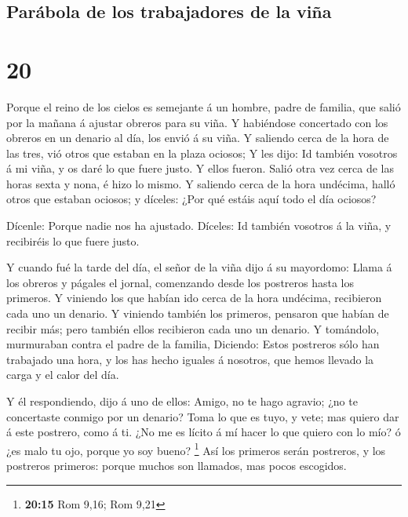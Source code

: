 \hypertarget{paruxe1bola-de-los-trabajadores-de-la-viuxf1a}{%
\subsection{Parábola de los trabajadores de la
viña}\label{paruxe1bola-de-los-trabajadores-de-la-viuxf1a}}

\hypertarget{section-19}{%
\section{20}\label{section-19}}

 Porque el reino de los cielos es semejante á un hombre,
padre de familia, que salió por la mañana á ajustar obreros para su
viña.  Y habiéndose concertado con los obreros en un
denario al día, los envió á su viña.  Y saliendo cerca de
la hora de las tres, vió otros que estaban en la plaza ociosos;
 Y les dijo: Id también vosotros á mi viña, y os daré lo
que fuere justo. Y ellos fueron.  Salió otra vez cerca de
las horas sexta y nona, é hizo lo mismo.  Y saliendo cerca
de la hora undécima, halló otros que estaban ociosos; y díceles: ¿Por
qué estáis aquí todo el día ociosos?

 Dícenle: Porque nadie nos ha ajustado. Díceles: Id
también vosotros á la viña, y recibiréis lo que fuere justo.

 Y cuando fué la tarde del día, el señor de la viña dijo á
su mayordomo: Llama á los obreros y págales el jornal, comenzando desde
los postreros hasta los primeros.  Y viniendo los que
habían ido cerca de la hora undécima, recibieron cada uno un denario.
 Y viniendo también los primeros, pensaron que habían de
recibir más; pero también ellos recibieron cada uno un denario.
 Y tomándolo, murmuraban contra el padre de la familia,
 Diciendo: Estos postreros sólo han trabajado una hora, y
los has hecho iguales á nosotros, que hemos llevado la carga y el calor
del día.

 Y él respondiendo, dijo á uno de ellos: Amigo, no te
hago agravio; ¿no te concertaste conmigo por un denario? 
Toma lo que es tuyo, y vete; mas quiero dar á este postrero, como á ti.
 ¿No me es lícito á mí hacer lo que quiero con lo mío? ó
¿es malo tu ojo, porque yo soy bueno? \footnote{\textbf{20:15} Rom 9,16;
  Rom 9,21}  Así los primeros serán postreros, y los
postreros primeros: porque muchos son llamados, mas pocos escogidos.

